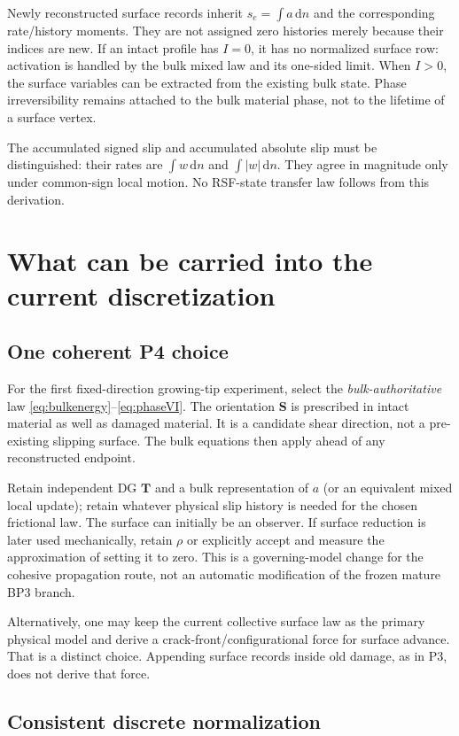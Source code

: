 \documentclass[11pt,a4paper]{article}
\numberwithin{equation}{section}
\newcommand{\dd}{\,\mathrm d}
\newcommand{\Sg}{\bm S}
\newcommand{\T}{\bm T}
\begin{document}
Newly reconstructed surface records inherit $s_e=\int a\dd n$ and the
corresponding rate/history moments. They are not assigned zero histories
merely because their indices are new.
If an intact profile has $I=0$, it has no normalized surface row:
activation is handled by the bulk mixed law and its one-sided limit.
When $I>0$, the surface variables can be extracted from the existing bulk
state. Phase irreversibility remains attached to the bulk material phase,
not to the lifetime of a surface vertex.

The accumulated signed slip and accumulated absolute slip must be
distinguished: their rates are $\int w\dd n$ and $\int|w|\dd n$.
They agree in magnitude only under common-sign local motion.
No RSF-state transfer law follows from this derivation.

\section{What can be carried into the current discretization}

\subsection{One coherent P4 choice}

For the first fixed-direction growing-tip experiment, select the
\emph{bulk-authoritative} law \eqref{eq:bulkenergy}--\eqref{eq:phaseVI}.
The orientation $\Sg$ is prescribed in intact material as well as damaged
material. It is a candidate shear direction, not a pre-existing slipping
surface. The bulk equations then apply ahead of any reconstructed endpoint.

Retain independent DG $\T$ and a bulk representation of $a$ (or an equivalent
mixed local update); retain whatever physical slip history is needed for the
chosen frictional law. The surface can initially be an observer.
If surface reduction is later used mechanically, retain $\rho$ or explicitly
accept and measure the approximation of setting it to zero.
This is a governing-model change for the cohesive propagation route, not
an automatic modification of the frozen mature BP3 branch.

Alternatively, one may keep the current collective surface law as the
primary physical model and derive a crack-front/configurational force for
surface advance. That is a distinct choice. Appending surface records
inside old damage, as in P3, does not derive that force.

\subsection{Consistent discrete normalization}
\end{document}
